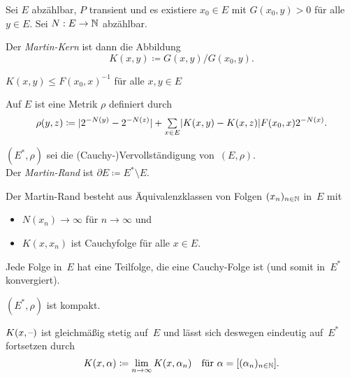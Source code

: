 \documentclass{cheat-sheet}
\begin{document}
\begin{situation}
  Sei $E$ abzählbar, $P$ transient und es existiere $x_0 \in E$ mit $G(x_0, y) > 0$ für alle $y \in E$.
  Sei $N : E \to \mathbb{N}$ abzählbar.
\end{situation}

\begin{defn}
  Der \emph{Martin-Kern} ist dann die Abbildung
  \[
    K(x, y) \coloneqq G(x, y) / G(x_0, y).
  \]
\end{defn}

\begin{lem}
  $K(x, y) \leq F(x_0, x)^{-1}$ für alle $x, y \in E$
\end{lem}

\begin{defn}
  Auf $E$ ist eine Metrik $\rho$ definiert durch
  \[
    \rho(y, z) \coloneqq \abs{2^{-N(y)} - 2^{-N(z)}} + \sum_{x \in E} \abs{K(x, y) - K(x, z)} F(x_0, x) 2^{-N(x)}.
  \]
\end{defn}

\begin{defn}
  \begin{minipage}[t]{0.85 \linewidth}
    $(E^*, \rho)$ sei die (Cauchy-)Vervollständigung von~$(E, \rho)$. \\
    Der \emph{Martin-Rand} ist $\partial E \coloneqq E^* \setminus E$.
  \end{minipage}
\end{defn}

\begin{bem}
  Der Martin-Rand besteht aus Äquivalenzklassen von Folgen $(x_n)_{n \in \mathbb{N}}$ in~$E$ mit
  \begin{itemize}
    \item $N(x_n) \to \infty$ für $n \to \infty$ und
    \item $K(x, x_n)$ ist Cauchyfolge für alle $x \in E$.
  \end{itemize}
\end{bem}

\begin{lem}
  Jede Folge in~$E$ hat eine Teilfolge, die eine Cauchy-Folge ist (und somit in~$E^*$ konvergiert).
\end{lem}

\begin{kor}
  $(E^*, \rho)$ ist kompakt.
\end{kor}

\begin{lemdefn}
  $K(x, \text{--})$ ist gleichmäßig stetig auf~$E$ und lässt sich deswegen eindeutig auf~$E^*$ fortsetzen durch
  \[
    K(x, \alpha) \coloneqq \lim_{n \to \infty} K(x, \alpha_n) \quad
    \text{für } \alpha = [(\alpha_n)_{n \in \mathbb{N}}].
  \]
\end{lemdefn}
\end{document}
